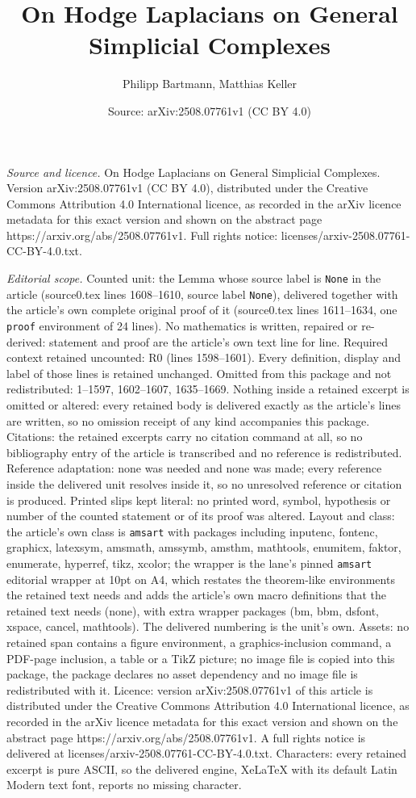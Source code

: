 \documentclass[10pt,a4paper]{amsart}
\title[On Hodge Laplacians on General Simplicial Complexes]{On Hodge Laplacians on General Simplicial Complexes}
\author{Philipp Bartmann, Matthias Keller}
\date{Source: arXiv:2508.07761v1 (CC BY 4.0)}
\begin{document}
\maketitle

\noindent\emph{Source and licence.} On Hodge Laplacians on General Simplicial Complexes. Version arXiv:2508.07761v1 (CC BY 4.0), distributed under the Creative Commons Attribution 4.0 International licence, as recorded in the arXiv licence metadata for this exact version and shown on the abstract page https://arxiv.org/abs/2508.07761v1. Full rights notice: licenses/arxiv-2508.07761-CC-BY-4.0.txt.\par\smallskip

\noindent\textit{Editorial scope.} Counted unit: the Lemma whose source label is \texttt{None} in the article (source0.tex lines 1608--1610, source label \texttt{None}), delivered together with the article's own complete original proof of it (source0.tex lines 1611--1634, one \texttt{proof} environment of 24 lines). No mathematics is written, repaired or re-derived: statement and proof are the article's own text line for line. Required context retained uncounted: R0 (lines 1598--1601). Every definition, display and label of those lines is retained unchanged. Omitted from this package and not redistributed: 1--1597, 1602--1607, 1635--1669. Nothing inside a retained excerpt is omitted or altered: every retained body is delivered exactly as the article's lines are written, so no omission receipt of any kind accompanies this package. Citations: the retained excerpts carry no citation command at all, so no bibliography entry of the article is transcribed and no reference is redistributed. Reference adaptation: none was needed and none was made; every reference inside the delivered unit resolves inside it, so no unresolved reference or citation is produced. Printed slips kept literal: no printed word, symbol, hypothesis or number of the counted statement or of its proof was altered. Layout and class: the article's own class is \texttt{amsart} with packages including inputenc, fontenc, graphicx, latexsym, amsmath, amssymb, amsthm, mathtools, enumitem, faktor, enumerate, hyperref, tikz, xcolor; the wrapper is the lane's pinned \texttt{amsart} editorial wrapper at 10pt on A4, which restates the theorem-like environments the retained text needs and adds the article's own macro definitions that the retained text needs (none), with extra wrapper packages (bm, bbm, dsfont, xspace, cancel, mathtools). The delivered numbering is the unit's own. Assets: no retained span contains a figure environment, a graphics-inclusion command, a PDF-page inclusion, a table or a TikZ picture; no image file is copied into this package, the package declares no asset dependency and no image file is redistributed with it. Licence: version arXiv:2508.07761v1 of this article is distributed under the Creative Commons Attribution 4.0 International licence, as recorded in the arXiv licence metadata for this exact version and shown on the abstract page https://arxiv.org/abs/2508.07761v1. A full rights notice is delivered at licenses/arxiv-2508.07761-CC-BY-4.0.txt. Characters: every retained excerpt is pure ASCII, so the delivered engine, XeLaTeX with its default Latin Modern text font, reports no missing character.
\end{document}
